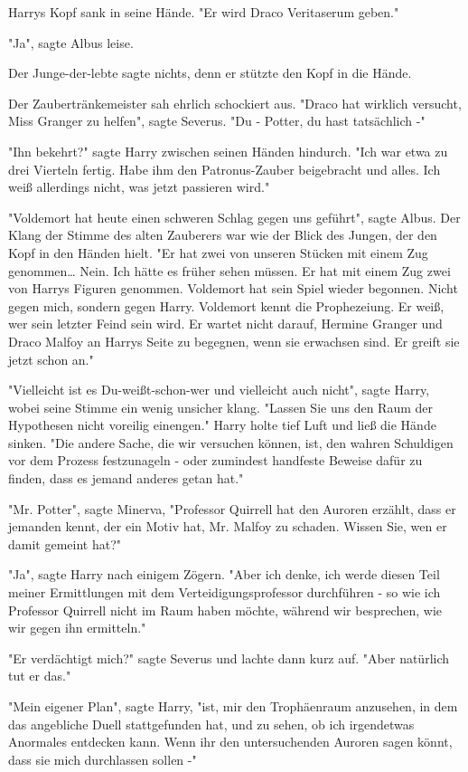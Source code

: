 {Harrys Kopf sank in seine Hände. "Er wird Draco Veritaserum geben."

"Ja", sagte Albus leise.

Der Junge-der-lebte sagte nichts, denn er stützte den Kopf in die Hände.

Der Zaubertränkemeister sah ehrlich schockiert aus. "Draco hat wirklich versucht, Miss Granger zu helfen", sagte Severus. "Du - Potter, du hast tatsächlich -"

"Ihn bekehrt?" sagte Harry zwischen seinen Händen hindurch. "Ich war etwa zu drei Vierteln fertig. Habe ihm den Patronus-Zauber beigebracht und alles. Ich weiß allerdings nicht, was jetzt passieren wird."

"Voldemort hat heute einen schweren Schlag gegen uns geführt", sagte Albus. Der Klang der Stimme des alten Zauberers war wie der Blick des Jungen, der den Kopf in den Händen hielt. "Er hat zwei von unseren Stücken mit einem Zug genommen… Nein. Ich hätte es früher sehen müssen. Er hat mit einem Zug zwei von Harrys Figuren genommen. Voldemort hat sein Spiel wieder begonnen. Nicht gegen mich, sondern gegen Harry. Voldemort kennt die Prophezeiung. Er weiß, wer sein letzter Feind sein wird. Er wartet nicht darauf, Hermine Granger und Draco Malfoy an Harrys Seite zu begegnen, wenn sie erwachsen sind. Er greift sie jetzt schon an."

"Vielleicht ist es Du-weißt-schon-wer und vielleicht auch nicht", sagte Harry, wobei seine Stimme ein wenig unsicher klang. "Lassen Sie uns den Raum der Hypothesen nicht voreilig einengen." Harry holte tief Luft und ließ die Hände sinken. "Die andere Sache, die wir versuchen können, ist, den wahren Schuldigen vor dem Prozess festzunageln - oder zumindest handfeste Beweise dafür zu finden, dass es jemand anderes getan hat."

"Mr. Potter", sagte Minerva, "Professor Quirrell hat den Auroren erzählt, dass er jemanden kennt, der ein Motiv hat, Mr. Malfoy zu schaden. Wissen Sie, wen er damit gemeint hat?"

"Ja", sagte Harry nach einigem Zögern. "Aber ich denke, ich werde diesen Teil meiner Ermittlungen mit dem Verteidigungsprofessor durchführen - so wie ich Professor Quirrell nicht im Raum haben möchte, während wir besprechen, wie wir gegen ihn ermitteln."

"Er verdächtigt mich?" sagte Severus und lachte dann kurz auf. "Aber natürlich tut er das."

"Mein eigener Plan", sagte Harry, "ist, mir den Trophäenraum anzusehen, in dem das angebliche Duell stattgefunden hat, und zu sehen, ob ich irgendetwas Anormales entdecken kann. Wenn ihr den untersuchenden Auroren sagen könnt, dass sie mich durchlassen sollen -"

}
